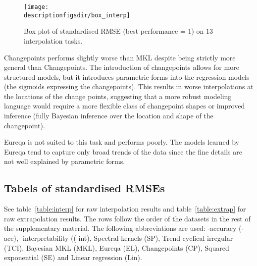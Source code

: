 \begin{figure*}[ht]
\centering
\texttt{[image: \\descriptionfigsdir/box\_interp]}
\caption{
Box plot of standardised RMSE (best performance = 1) on 13 interpolation tasks.
}
\label{fig:box_interp}
\end{figure*}

Changepoints performs slightly worse than MKL despite being strictly more general than Changepoints.
The introduction of changepoints allows for more structured models, but it introduces parametric forms into the regression models (\ie the sigmoids expressing the changepoints).
This results in worse interpolations at the locations of the change points, suggesting that a more robust modeling language would require a more flexible class of changepoint shapes or improved inference (\eg fully Bayesian inference over the location and shape of the changepoint).

Eureqa is not suited to this task and performs poorly.
The models learned by Eureqa tend to capture only broad trends of the data since the fine details are not well explained by parametric forms.

\subsection{Tabels of standardised RMSEs}

See table~\ref{table:interp} for raw interpolation results and table~\ref{table:extrap} for raw extrapolation results. 
The rows follow the order of the datasets in the rest of the supplementary material.
The following abbreviations are used: \procedurename{}-accuracy (\procedurename{}-acc), \procedurename{}-interpretability ((\procedurename{}-int), Spectral kernels (SP), Trend-cyclical-irregular (TCI), Bayesian MKL (MKL), Eureqa (EL), Changepoints (CP), Squared exponential (SE) and Linear regression (Lin).

